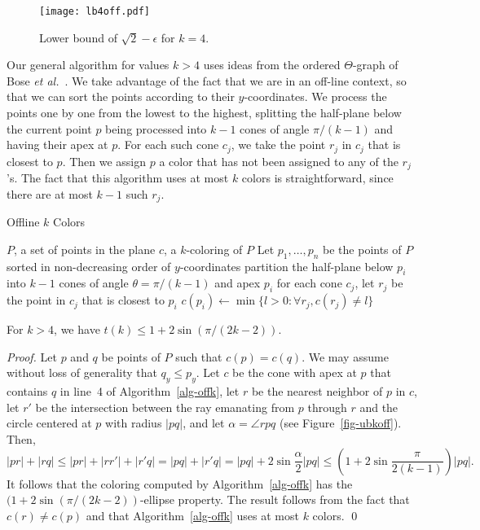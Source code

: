 \documentclass[pdftex,leqno,fleqn,12pts]{llncs}
\begin{document}
\begin{figure}
\centering\texttt{[image: lb4off.pdf]}\caption{Lower bound of
$\sqrt{2}-\epsilon$ for $k=4$.}\label{fig-lb4off}
\end{figure}

Our general algorithm for values $k > 4$ uses ideas from the ordered 
$\Theta$-graph of Bose \emph{et al.}~\cite{bose04a}. 
We take advantage of the fact that we are in an off-line context, so that 
we can sort the points according to their $y$-coordinates. We process 
the points one by one from the lowest to the highest, splitting the 
half-plane below the current point $p$ being processed into $k-1$ cones 
of angle $\pi / (k-1)$ and having their apex at $p$. 
For each such cone $c_j$, we take the point $r_j$ in $c_j$ that is 
closest to $p$. Then we assign $p$ a color that has not been assigned to 
any of the $r_j$'s. The fact that this algorithm uses at most $k$ colors 
is straightforward, since there are at most $k-1$ such $r_j$. 

\begin{algorithm}
\caption{Offline $k$ Colors}\label{alg-offk}
\begin{algorithmic}[1]
\REQUIRE $P$, a set of points in the plane 
\ENSURE $c$, a $k$-coloring of $P$ 
\STATE Let $p_1,\ldots,p_n$ be the points of $P$ sorted in non-decreasing 
order of $y$-coordinates 
\STATE partition the half-plane below $p_i$ into $k-1$ cones of
angle $\theta=\pi/(k-1)$ and apex $p_i$ 
\STATE for each cone $c_j$, let $r_j$ be the point in $c_j$ that is 
closest to $p_i$ 
\STATE $c(p_i)\leftarrow \min\{l>0:\forall r_j,c(r_j)\neq l\}$ 
\ENDFOR
\end{algorithmic}
\end{algorithm}


\begin{lemma} \label{prop-ubkoff}
For $k>4$, we have $t(k)\leq 1+2\sin(\pi/(2k-2))$.
\end{lemma}
\begin{proof}
Let $p$ and $q$ be points of $P$ such that $c(p)=c(q)$. We may assume 
without loss of generality that $q_y\leq p_y$. Let $c$ be 
the cone with apex at $p$ that contains $q$ in line~4 of 
Algorithm~\ref{alg-offk}, let $r$ be the nearest neighbor of $p$ in $c$, 
let $r'$ be the intersection between the ray emanating from $p$ through $r$ 
and the circle centered at $p$ with radius $|pq|$,
and let $\alpha=\angle rpq$ (see Figure~\ref{fig-ubkoff}). Then,
\[ |pr| + |rq| \leq |pr| + |rr'| + |r'q| = |pq| + |r'q| =  
         |pq| + 2\sin\frac{\alpha}{2}|pq|
     \leq (1+2\sin\frac{\pi}{2(k-1)})|pq| . 
\] 
It follows that the coloring computed by Algorithm~\ref{alg-offk} 
has the $(1+2\sin(\pi/(2k-2))$-ellipse property. The result follows 
from the fact that $c(r)\neq c(p)$ and that Algorithm~\ref{alg-offk} 
uses at most $k$ colors.
\qed 
\end{proof}
\end{document}
